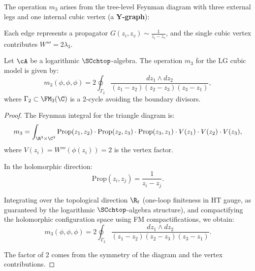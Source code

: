 The operation $m_3$ arises from the tree-level Feynman diagram with three external legs and one internal cubic vertex (a \textbf{Y-graph}):

\begin{center}
\end{center}

Each edge represents a propagator $G(z_i, z_v) \sim \frac{1}{z_i - z_v}$, and the single cubic vertex contributes $W''' = 2\lambda_3$.

\begin{proposition}
Let\/ $\cA$ be a logarithmic\/ $\SCchtop$-algebra.
The operation $m_3$ for the LG cubic model is given by:
\begin{equation}
m_3(\phi, \phi, \phi) = 2 \oint_{\Gamma_2} \frac{dz_1 \wedge dz_2}{(z_1 - z_2)(z_2 - z_3)(z_3 - z_1)},
\end{equation}
where $\Gamma_2 \subset \FM_3(\C)$ is a 2-cycle avoiding the boundary divisors.
\end{proposition}

\begin{proof}
The Feynman integral for the triangle diagram is:
\begin{equation}
m_3 = \int_{\R^3 \times \C^3} \text{Prop}(z_1, z_2) \cdot \text{Prop}(z_2, z_3) \cdot \text{Prop}(z_3, z_1) \cdot V(z_1) \cdot V(z_2) \cdot V(z_3),
\end{equation}
where $V(z_i) = W'''(\phi(z_i)) = 2$ is the vertex factor.

In the holomorphic direction:
\begin{equation}
\text{Prop}(z_i, z_j) = \frac{1}{z_i - z_j}.
\end{equation}

Integrating over the topological direction $\R_t$ (one-loop finiteness in HT gauge, as guaranteed by the logarithmic $\SCchtop$-algebra structure), and compactifying the holomorphic configuration space using FM compactifications, we obtain:
\begin{equation}
m_3(\phi, \phi, \phi) = 2 \oint_{\Gamma_2} \frac{dz_1 \wedge dz_2}{(z_1 - z_2)(z_2 - z_3)(z_3 - z_1)}.
\end{equation}

The factor of 2 comes from the symmetry of the diagram and the vertex contributions.
\end{proof}

